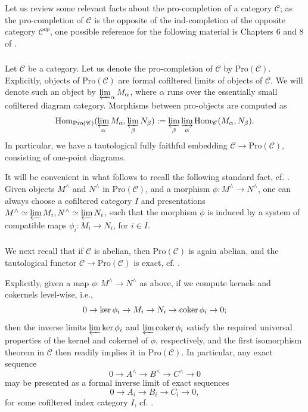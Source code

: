 \documentclass{amsart}
\theoremstyle{definition}
\newcommand{\coker}{\on{coker}\hspace{.5mm}}
\newcommand{\sC}{\mathscr{C}}
\newcommand{\Proc}{\on{Pro}(\sC)}
\newcommand{\Pro}{\on{Pro}}
\newcommand{\sss}{\subsubsection{}}
\newcommand{\Hom}{\on{Hom}}
\newcommand{\on}{\mathrm}
\numberwithin{equation}{section}
\begin{document}
\sss Let us review some relevant facts about the pro-completion of a category $\sC$; as the pro-completion of $\sC$ is the opposite of the ind-completion of the opposite category $\sC^{op}$, one possible reference for the following material is Chapters 6 and 8 of \cite{KS}. 


\sss Let $\sC$ be a category. Let us denote the pro-completion of $\sC$ by $\Proc$. Explicitly, objects of $\Proc$ are formal cofiltered limits of objects of $\sC$. We will denote such an object by $\varprojlim_\alpha M_\alpha$, where $\alpha$ runs over the essentially small cofiltered diagram category. Morphisms between pro-objects are computed as 
$$\Hom_{\Proc}(\varprojlim_\alpha M_\alpha, \varprojlim_\beta N_\beta) := \varprojlim_{\beta} \varinjlim_{\alpha} \Hom_{\sC}(M_\alpha, N_\beta).$$
In particular, we have a tautological fully faithful embedding $\sC \rightarrow \Proc$, consisting of one-point diagrams. 

It will be convenient in what follows to recall the following standard fact, cf. \cite[Corollary 6.1.14]{KS}. Given objects $M^\wedge$ and $N^\wedge$ in $\Proc$, and a morphism $\phi: M^\wedge \rightarrow N^\wedge$, one can always choose a cofiltered category $I$ and presentations $M^\wedge \simeq \varprojlim M_i, N^\wedge \simeq \varprojlim N_i$, such that the morphism $\phi$ is induced by a system of compatible maps $\phi_i: M_i \rightarrow N_i$, for $i \in I$. 

\sss We next recall that if $\sC$ is abelian, then $\Pro(\sC)$ is again abelian, and the tautological functor $\sC \rightarrow \Proc$ is exact, cf.   \cite[Theorem 8.6.5]{KS}. 

Explicitly, given a map $\phi: M^\wedge \rightarrow N^\wedge$ as above, if we compute kernels and cokernels level-wise, i.e.,
$$0 \rightarrow \ker \phi_i \rightarrow M_i \rightarrow N_i \rightarrow \coker \phi_i \rightarrow 0;$$
then the inverse limits $\varprojlim \ker \phi_i$ and $\varprojlim \coker \phi_i$ satisfy the required universal properties of the kernel and cokernel of $\phi$, respectively, and the first isomorphism theorem in $\sC$ then readily implies it in $\Pro(\sC)$. In particular, any exact sequence $$0 \rightarrow A^\wedge \rightarrow B^\wedge \rightarrow C^\wedge \rightarrow 0$$
may be presented as a formal inverse limit of exact sequences
\begin{equation} \label{e:ses}0 \rightarrow A_i \rightarrow B_i \rightarrow C_i \rightarrow 0,\end{equation}
for some cofiltered index category $I$, cf.   \cite[Proposition 8.6.6(a)]{KS}. 
\end{document}
